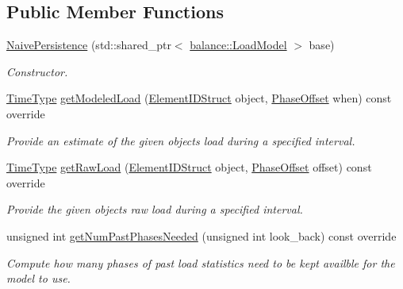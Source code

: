 \subsection*{Public Member Functions}
\begin{DoxyCompactItemize}
\item 
\hyperlink{structvt_1_1vrt_1_1collection_1_1balance_1_1_naive_persistence_a7eb9921b30fbf64f3c2dbbe5a8cce396}{Naive\+Persistence} (std\+::shared\+\_\+ptr$<$ \hyperlink{structvt_1_1vrt_1_1collection_1_1balance_1_1_load_model}{balance\+::\+Load\+Model} $>$ base)
\begin{DoxyCompactList}\small\item\em Constructor. \end{DoxyCompactList}\item 
\hyperlink{namespacevt_a876a9d0cd5a952859c72de8a46881442}{Time\+Type} \hyperlink{structvt_1_1vrt_1_1collection_1_1balance_1_1_naive_persistence_a3b7513c6552fc464a12b2d2b076a5c55}{get\+Modeled\+Load} (\hyperlink{namespacevt_1_1vrt_1_1collection_1_1balance_a9f5b53fafb270212279a4757d2c4cd28}{Element\+I\+D\+Struct} object, \hyperlink{structvt_1_1vrt_1_1collection_1_1balance_1_1_phase_offset}{Phase\+Offset} when) const override
\begin{DoxyCompactList}\small\item\em Provide an estimate of the given object\textquotesingle{}s load during a specified interval. \end{DoxyCompactList}\item 
\hyperlink{namespacevt_a876a9d0cd5a952859c72de8a46881442}{Time\+Type} \hyperlink{structvt_1_1vrt_1_1collection_1_1balance_1_1_naive_persistence_aa339c8448a59cf522577f573fd5ed95c}{get\+Raw\+Load} (\hyperlink{namespacevt_1_1vrt_1_1collection_1_1balance_a9f5b53fafb270212279a4757d2c4cd28}{Element\+I\+D\+Struct} object, \hyperlink{structvt_1_1vrt_1_1collection_1_1balance_1_1_phase_offset}{Phase\+Offset} offset) const override
\begin{DoxyCompactList}\small\item\em Provide the given object\textquotesingle{}s raw load during a specified interval. \end{DoxyCompactList}\item 
unsigned int \hyperlink{structvt_1_1vrt_1_1collection_1_1balance_1_1_naive_persistence_a2842669870cdef1ab7d5f63d23951f69}{get\+Num\+Past\+Phases\+Needed} (unsigned int look\+\_\+back) const override
\begin{DoxyCompactList}\small\item\em Compute how many phases of past load statistics need to be kept availble for the model to use. \end{DoxyCompactList}\end{DoxyCompactItemize}


